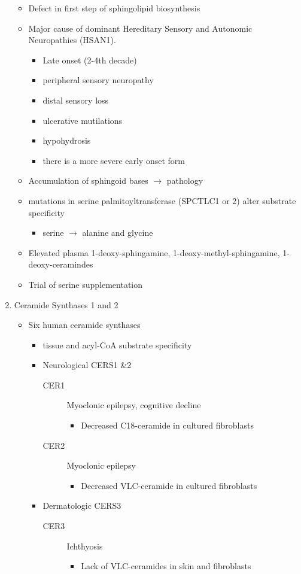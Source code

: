 \documentclass{scrartcl}
\begin{document}
\begin{enumerate}
\begin{itemize}
\item Defect in first step of sphingolipid biosynthesis
\item Major cause of dominant Hereditary Sensory and Autonomic Neuropathies (HSAN1).
\begin{itemize}
\item Late onset (2-4th decade)
\item peripheral sensory neuropathy
\item distal sensory loss
\item ulcerative mutilations
\item hypohydrosis
\item there is a more severe early onset form
\end{itemize}
\item Accumulation of sphingoid bases \(\to\) pathology
\item mutations in serine palmitoyltransferase (SPCTLC1 or 2) alter
substrate specificity
\begin{itemize}
\item serine \(\to\) alanine and glycine
\end{itemize}
\item Elevated plasma 1-deoxy-sphingamine, 1-deoxy-methyl-sphingamine, 1-deoxy-ceramindes
\item Trial of serine supplementation
\end{itemize}

\item Ceramide Synthases 1 and 2
\label{sec:org9beecc2}

\begin{itemize}
\item Six human ceramide synthases
\begin{itemize}
\item tissue and acyl-CoA substrate specificity
\item Neurological CERS1 \&2
\begin{description}
\item[{CER1}] Myoclonic epilepsy, cognitive decline
\begin{itemize}
\item Decreased C18-ceramide in cultured fibroblasts
\end{itemize}
\item[{CER2}] Myoclonic epilepsy
\begin{itemize}
\item Decreased VLC-ceramide in cultured fibroblasts
\end{itemize}
\end{description}
\item Dermatologic CERS3
\begin{description}
\item[{CER3}] Ichthyosis
\begin{itemize}
\item Lack of VLC-ceramides in skin and fibroblasts
\end{itemize}
\end{description}
\end{itemize}
\end{itemize}


\end{enumerate}
\end{document}
